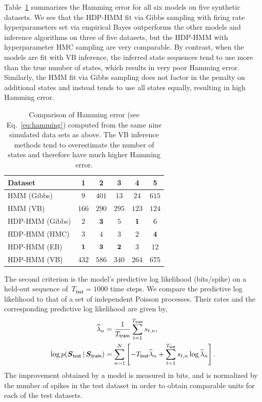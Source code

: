 Table~\ref{tab:synth_hamming} summarizes the Hamming error for all six
models on five synthetic datasets. We see that the HDP-HMM fit via
Gibbs sampling with firing rate hyperparameters set via empirical
Bayes outperforms the other models and inference algorithms on three
of five datasets, but the HDP-HMM with hyperparameter HMC sampling are
very comparable. By contrast, when the models are fit with VB
inference, the inferred state sequences tend to use more than the true
number of states, which results in very poor Hamming error. Similarly,
the HMM fit via Gibbs sampling does not factor in the penalty on
additional states and instead tends to use all states equally,
resulting in high Hamming error.

\begin{table}
  \centering
  \caption[Comparison of Hamming error on synthetic data]{Comparison
    of Hamming error (see Eq.~\ref{eq:hamming}) computed from the same
    nine simulated data sets as above. The VB inference methods tend
    to overestimate the number of states and therefore have much
    higher Hamming error.}
  \begin{tabular}{l|ccccc}
    Dataset & 1 & 2 & 3 & 4 & 5 \\
    \hline
    HMM (Gibbs)     & $9$ & $401$ & $13$ & $24$ & $615$ \\
    HMM (VB)        & $166$ & $290$ & $295$ & $123$ & $124$ \\
    HDP-HMM (Gibbs) & $2$ & $\bf{3}$ & $5$ & $\bf{1}$ & $6$ \\
    HDP-HMM (HMC)   & $3$ & $4$ & $3$ & $2$ & $\bf{4}$ \\
    HDP-HMM (EB)    & $\bf{1}$ & $\bf{3}$ & $\bf{2}$ & $3$ & $12$ \\ 
    HDP-HMM (VB)    & $432$ & $586$ & $340$ & $264$ & $675$ \\
    \hline
  \end{tabular}
  \label{tab:synth_hamming}
\end{table}

The second criterion is the model's predictive log likelihood
(bits/spike) on a held-out sequence of~${T_{\mathsf{test}}=1000}$ time
steps. We compare the predictive log likelihood to that of a set of
independent Poisson processes. Their rates and the corresponding
predictive log likelihood are given by,
\begin{align*}
\widehat{\lambda}_n 
  &=\frac{1}{T_{\mathsf{train}}}\sum_{t=1}^{T_{\mathsf{train}}} s_{t,n}, \\
  \log p(\boldsymbol{S}_{\mathsf{test}} \,|\, \boldsymbol{S}_{\mathsf{train}}) &= \sum_{n=1}^N \left[ -T_{\mathsf{test}} \widehat{\lambda}_n + \sum_{t=1}^{T_{\mathsf{test}}} s_{t,n} \log \widehat{\lambda}_n  \right].
\end{align*}
The improvement obtained by a model is measured in bits, and is
normalized by the number of spikes in the test dataset in order to
obtain comparable units for each of the test datasets.

